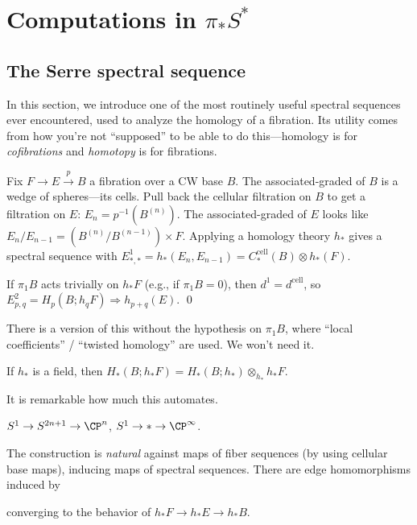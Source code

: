 
\chapter{Computations in $\pi_* S^*$}




\section{The Serre spectral sequence}

In this section, we introduce one of the most routinely useful spectral sequences ever encountered, used to analyze the homology of a fibration.  Its utility comes from how you're not ``supposed'' to be able to do this---homology is for \emph{cofibrations} and \emph{homotopy} is for fibrations.

Fix $F \to E \xrightarrow p B$ a fibration over a CW base $B$.  The associated-graded of $B$ is a wedge of spheres---its cells.  Pull back the cellular filtration on $B$ to get a filtration on $E$: $E_n = p^{-1}(B^{(n)})$.  The associated-graded of $E$ looks like $E_n / E_{n-1} = (B^{(n)} / B^{(n-1)}) \times F$.  Applying a homology theory $h_*$ gives a spectral sequence with $E^1_{*, *} = h_*(E_n, E_{n-1}) = C^{\mathrm{cell}}_*(B) \otimes h_*(F)$.

\begin{theorem}[Serre]
If $\pi_1 B$ acts trivially on $h_* F$ (e.g., if $\pi_1 B = 0$), then $d^1 = d^{\mathrm{cell}}$, so $E^2_{p, q} = H_p(B; h_q F) \Rightarrow h_{p+q}(E)$. \qed
\end{theorem}

\begin{remark}
There is a version of this without the hypothesis on $\pi_1 B$, where ``local coefficients'' / ``twisted homology'' are used.  We won't need it.
\end{remark}

\begin{remark}
If $h_*$ is a field, then $H_*(B; h_* F) = H_*(B; h_*) \otimes_{h_*} h_* F$.
\end{remark}

It is remarkable how much this automates.

\begin{example}
$S^1 \to S^{2n+1} \to \CP^n$, $S^1 \to * \to \CP^\infty$.
\end{example}

The construction is \emph{natural} against maps of fiber sequences (by using cellular base maps), inducing maps of spectral sequences.  There are edge homomorphisms induced by
\begin{center}
\end{center}
converging to the behavior of $h_* F \to h_* E \to h_* B$.

